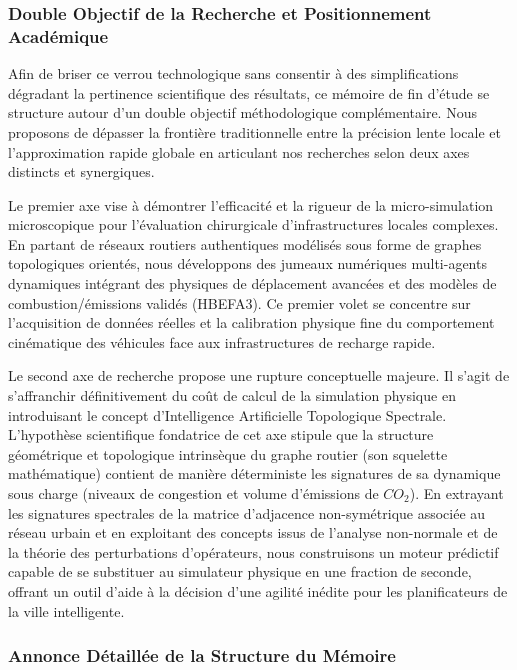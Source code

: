 \documentclass[10pt, a4paper]{article}
\begin{document}
\subsubsection{Double Objectif de la Recherche et Positionnement
Académique}\label{double-objectif-de-la-recherche-et-positionnement-acaduxe9mique}

Afin de briser ce verrou technologique sans consentir à des
simplifications dégradant la pertinence scientifique des résultats, ce
mémoire de fin d'étude se structure autour d'un double objectif
méthodologique complémentaire. Nous proposons de dépasser la frontière
traditionnelle entre la précision lente locale et l'approximation rapide
globale en articulant nos recherches selon deux axes distincts et
synergiques.

Le premier axe vise à démontrer l'efficacité et la rigueur de la
micro-simulation microscopique pour l'évaluation chirurgicale
d'infrastructures locales complexes. En partant de réseaux routiers
authentiques modélisés sous forme de graphes topologiques orientés, nous
développons des jumeaux numériques multi-agents dynamiques intégrant des
physiques de déplacement avancées et des modèles de combustion/émissions
validés (HBEFA3). Ce premier volet se concentre sur l'acquisition de
données réelles et la calibration physique fine du comportement
cinématique des véhicules face aux infrastructures de recharge rapide.

Le second axe de recherche propose une rupture conceptuelle majeure. Il
s'agit de s'affranchir définitivement du coût de calcul de la simulation
physique en introduisant le concept d'Intelligence Artificielle
Topologique Spectrale. L'hypothèse scientifique fondatrice de cet axe
stipule que la structure géométrique et topologique intrinsèque du
graphe routier (son squelette mathématique) contient de manière
déterministe les signatures de sa dynamique sous charge (niveaux de
congestion et volume d'émissions de \(CO_2\)). En extrayant les
signatures spectrales de la matrice d'adjacence non-symétrique associée
au réseau urbain et en exploitant des concepts issus de l'analyse
non-normale et de la théorie des perturbations d'opérateurs, nous
construisons un moteur prédictif capable de se substituer au simulateur
physique en une fraction de seconde, offrant un outil d'aide à la
décision d'une agilité inédite pour les planificateurs de la ville
intelligente.

\subsubsection{Annonce Détaillée de la Structure du
Mémoire}\label{annonce-duxe9tailluxe9e-de-la-structure-du-muxe9moire}
\end{document}
